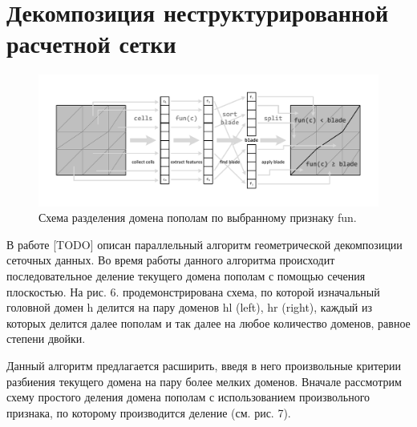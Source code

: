 \documentclass[
11pt,%
tightenlines,%
twoside,%
onecolumn,%
nofloats,%
nobibnotes,%
nofootinbib,%
superscriptaddress,%
noshowpacs,%
centertags]%
{revtex4}
\begin{document}
\section{Декомпозиция неструктурированной расчетной сетки}

\begin{figure}[h]
\includegraphics[width=1.0\textwidth]{pics/03-split.pdf}
\caption{Схема разделения домена пополам по выбранному признаку fun.}\label{fig:03-split}
\end{figure}

В работе [TODO] описан параллельный алгоритм геометрической декомпозиции сеточных данных. Во время работы данного алгоритма происходит последовательное деление текущего домена пополам с помощью сечения плоскостью. На рис. 6. продемонстрирована схема, по которой изначальный головной домен h делится на пару доменов hl (left), hr (right), каждый из которых делится далее пополам и так далее на любое количество доменов, равное степени двойки.

Данный алгоритм предлагается расширить, введя в него произвольные критерии разбиения текущего домена на пару более мелких доменов. Вначале рассмотрим схему простого деления домена пополам с использованием произвольного признака, по которому производится деление (см. рис. 7).
\end{document}
